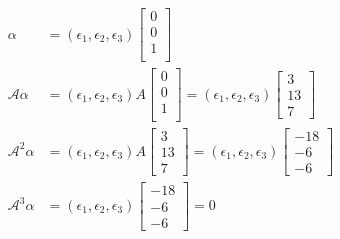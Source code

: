 \documentclass{article}
\begin{document}
\begin{align*}
  \alpha               & = (\epsilon_1, \epsilon_2, \epsilon_3) \begin{bmatrix}
                                                                  0 \\
                                                                  0 \\
                                                                  1 \\
                                                                \end{bmatrix}   \\
  \mathscr{A} \alpha   & = (\epsilon_1, \epsilon_2, \epsilon_3) A \begin{bmatrix}
                                                                    0 \\
                                                                    0 \\
                                                                    1 \\
                                                                  \end{bmatrix}
  = (\epsilon_1, \epsilon_2, \epsilon_3) \begin{bmatrix}
                                           3  \\
                                           13 \\
                                           7
                                         \end{bmatrix}                          \\
  \mathscr{A}^2 \alpha & = (\epsilon_1, \epsilon_2, \epsilon_3) A \begin{bmatrix}
                                                                    3  \\
                                                                    13 \\
                                                                    7
                                                                  \end{bmatrix}
  = (\epsilon_1, \epsilon_2, \epsilon_3) \begin{bmatrix}
                                           - 18 \\
                                           -6   \\
                                           -6
                                         \end{bmatrix}                          \\
  \mathscr{A}^3 \alpha & = (\epsilon_1, \epsilon_2, \epsilon_3) \begin{bmatrix}
                                                                  - 18 \\
                                                                  -6   \\
                                                                  -6
                                                                \end{bmatrix}
  = 0
\end{align*}
\end{document}
